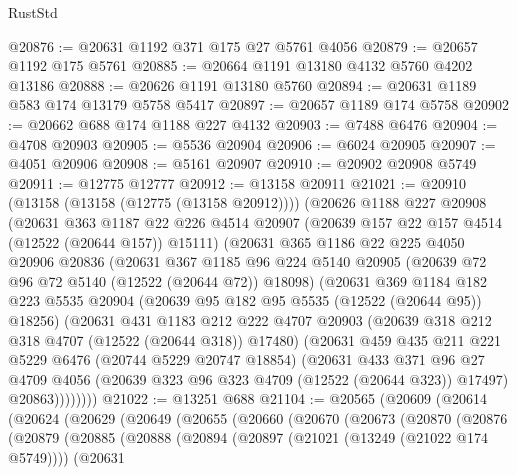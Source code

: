 \begin{lexlean}{RustStd}
\begin{coremodule}
@20876 := @20631 @1192 @371 @175 @27 @5761 @4056
@20879 := @20657 @1192 @175 @5761
@20885 := @20664 @1191 @13180 @4132 @5760 @4202 @13186
@20888 := @20626 @1191 @13180 @5760
@20894 := @20631 @1189 @583 @174 @13179 @5758 @5417
@20897 := @20657 @1189 @174 @5758
@20902 := @20662 @688 @174 @1188 @227 @4132
@20903 := @7488 @6476
@20904 := @4708 @20903
@20905 := @5536 @20904
@20906 := @6024 @20905
@20907 := @4051 @20906
@20908 := @5161 @20907
@20910 := @20902 @20908 @5749
@20911 := @12775 @12777
@20912 := @13158 @20911
@21021 := @20910
    (@13158 (@13158 (@12775 (@13158 @20912))))
    (@20626
      @1188
      @227
      @20908
      (@20631
        @363
        @1187
        @22
        @226
        @4514
        @20907
        (@20639 @157 @22 @157 @4514 (@12522 (@20644 @157)) @15111)
        (@20631
          @365
          @1186
          @22
          @225
          @4050
          @20906
          @20836
          (@20631
            @367
            @1185
            @96
            @224
            @5140
            @20905
            (@20639 @72 @96 @72 @5140 (@12522 (@20644 @72)) @18098)
            (@20631
              @369
              @1184
              @182
              @223
              @5535
              @20904
              (@20639 @95 @182 @95 @5535 (@12522 (@20644 @95)) @18256)
              (@20631
                @431
                @1183
                @212
                @222
                @4707
                @20903
                (@20639 @318 @212 @318 @4707 (@12522 (@20644 @318)) @17480)
                (@20631
                  @459
                  @435
                  @211
                  @221
                  @5229
                  @6476
                  (@20744 @5229 @20747 @18854)
                  (@20631
                    @433
                    @371
                    @96
                    @27
                    @4709
                    @4056
                    (@20639 @323 @96 @323 @4709 (@12522 (@20644 @323)) @17497)
                    @20863))))))))
@21022 := @13251 @688
@21104 := @20565
    (@20609
      (@20614
        (@20624
          (@20629
            (@20649
              (@20655
                (@20660
                  (@20670
                    (@20673
                      (@20870
                        (@20876
                          (@20879
                            (@20885
                              (@20888
                                (@20894
                                  (@20897 (@21021 (@13249 (@21022 @174 @5749))))
                                  (@20631

\end{coremodule}
\end{lexlean}
